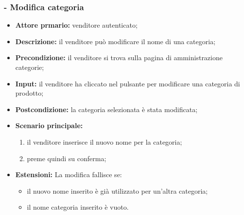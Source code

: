 \subsubsection{- Modifica categoria}
\begin{itemize}
    \item \textbf{Attore prmario:} venditore autenticato;
    \item \textbf{Descrizione:} il venditore può modificare il nome di una categoria;
    \item \textbf{Precondizione:} il venditore si trova sulla pagina di amministrazione categorie;
    \item \textbf{Input:} il venditore ha cliccato nel pulsante per modificare una categoria di prodotto;
    \item \textbf{Postcondizione:} la categoria selezionata è stata modificata;
    \item \textbf{Scenario principale:}
          \begin{enumerate}
              \item il venditore inserisce il nuovo nome per la categoria;
              \item preme quindi su conferma;
          \end{enumerate}
    \item \textbf{Estensioni:} La modifica fallisce se:
          \begin{itemize}
              \item il nuovo nome inserito è già utilizzato per un'altra categoria;
              \item il nome categoria inserito è vuoto.
          \end{itemize}
\end{itemize}

\stepsubUserCase

